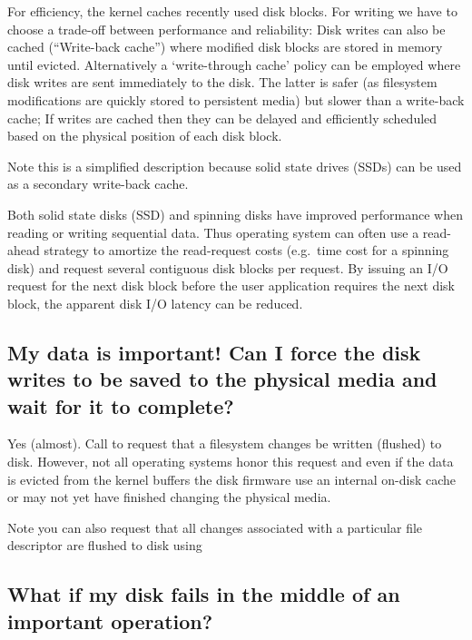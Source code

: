 For efficiency, the kernel caches recently used disk blocks. For writing we have to choose a trade-off between performance and reliability: Disk writes can also be cached (``Write-back cache'') where modified disk blocks are stored in memory until evicted. Alternatively a `write-through cache' policy can be employed where disk writes are sent immediately to the disk. The latter is safer (as filesystem modifications are quickly stored to persistent media) but slower than a write-back cache; If writes are cached then they can be delayed and efficiently scheduled based on the physical position of each disk block.

Note this is a simplified description because solid state drives (SSDs) can be used as a secondary write-back cache.

Both solid state disks (SSD) and spinning disks have improved performance when reading or writing sequential data. Thus operating system can often use a read-ahead strategy to amortize the read-request costs (e.g.~time cost for a spinning disk) and request several contiguous disk blocks per request. By issuing an I/O request for the next disk block before the user application requires the next disk block, the apparent disk I/O latency can be reduced.

\subsection{My data is important! Can I force the disk writes to be saved to the physical media and wait for it to complete?}\label{my-data-is-important-can-i-force-the-disk-writes-to-be-saved-to-the-physical-media-and-wait-for-it-to-complete}

Yes (almost). Call  to request that a filesystem changes be written (flushed) to disk. However, not all operating systems honor this request and even if the data is evicted from the kernel buffers the disk firmware use an internal on-disk cache or may not yet have finished changing the physical media.

Note you can also request that all changes associated with a particular file descriptor are flushed to disk using 

\subsection{What if my disk fails in the middle of an important operation?}\label{what-if-my-disk-fails-in-the-middle-of-an-important-operation}

